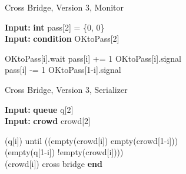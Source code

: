\documentclass{article}
\renewcommand{\algorithmicrequire}{\textbf{Input: }}
\begin{document}
\begin{algorithm}[H]
  \caption{Cross Bridge, Version 3, Monitor}
  \algorithmicrequire \textbf{int} pass[2] = \{0, 0\} \\
  \algorithmicrequire \textbf{condition} OKtoPass[2] \\

  \begin{algorithmic}
        \State OKtoPass[i].wait
      \EndIf
      \State pass[i] += 1
       
        \State OKtoPass[i].signal
      \EndIf
    \EndProcedure
    \\
      \State pass[i] -= 1
        \State OKtoPass[1-i].signal
      \EndIf
    \EndProcedure
  \end{algorithmic}
\end{algorithm}


\begin{algorithm}[H]
  \caption{Cross Bridge, Version 3, Serializer}
  \algorithmicrequire \textbf{queue} q[2] \\
  \algorithmicrequire \textbf{crowd} crowd[2] \\

  \begin{algorithmic}
      \State \enqueue(q[i]) until ((empty(crowd[i]) \And empty(crowd[1-i])) \\
      \State \textit{           } \Or (empty(q[1-i]) \And !empty(crowd[i]))) \\
      \State \joincrowd(crowd[i])
        \State \textit{          }cross bridge
      \State \textbf{end}
    \EndProcedure
  \end{algorithmic}
\end{algorithm}



%
%
%
\end{document}
